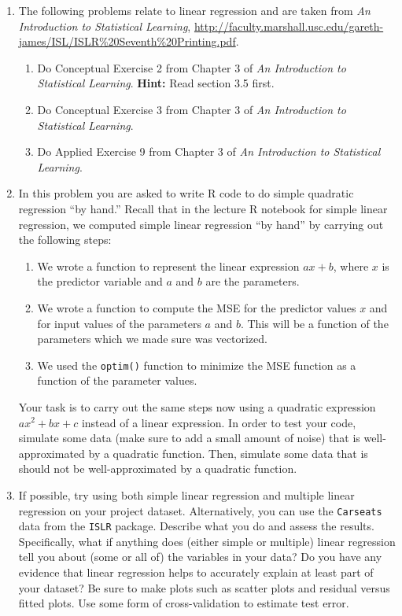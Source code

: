 \documentclass[12pt]{article}\usepackage[]{graphicx}\usepackage[]{color}
\begin{document}
\begin{enumerate}
\item The following problems relate to linear regression and are taken from \emph{An Introduction to Statistical Learning}, \url{http://faculty.marshall.usc.edu/gareth-james/ISL/ISLR%20Seventh%20Printing.pdf}.

     \begin{enumerate}
\item  Do Conceptual Exercise 2 from Chapter 3 of \emph{An Introduction to Statistical Learning}. {\bf Hint:} Read section 3.5 first.         
    \item  Do Conceptual Exercise 3 from Chapter 3 of \emph{An Introduction to Statistical Learning}.
     \item  Do Applied Exercise 9 from Chapter 3 of \emph{An Introduction to Statistical Learning}.
     \end{enumerate}
     
     \item In this problem you are asked to write R code to do simple quadratic regression ``by hand.'' Recall that in the lecture R notebook for simple linear regression, we computed simple linear regression ``by hand'' by carrying out the following steps:
     
     \begin{enumerate}
     \item We wrote a function to represent the linear expression $ax+b$, where $x$ is the predictor variable and $a$ and $b$ are the parameters. 
     \item We wrote a function to compute the MSE for the predictor values $x$ and for input values of the parameters $a$ and $b$. This will be a function of the parameters which we made sure was vectorized.
     \item  We used the {\tt optim()} function to minimize the MSE function as a function of the parameter values. 
     \end{enumerate}
     
     
     Your task is to carry out the same steps now using a quadratic expression $ax^2 + bx + c$ instead of a linear expression. In order to test your code, simulate some data (make sure to add a small amount of noise) that is well-approximated by a quadratic function.  Then, simulate some data that is should not be well-approximated by a quadratic function.  

\item If possible, try using both simple linear regression and multiple linear regression on your project dataset. Alternatively, you can use the {\tt Carseats} data from the {\tt ISLR} package. Describe what you do and assess the results. Specifically, what if anything does (either simple or multiple) linear regression tell you about (some or all of) the variables in your data? Do you have any evidence that linear regression helps to accurately explain at least part of your dataset? Be sure to make plots such as scatter plots and residual versus fitted plots. Use some form of cross-validation to estimate test error.  
  


\end{enumerate}
\end{document}
